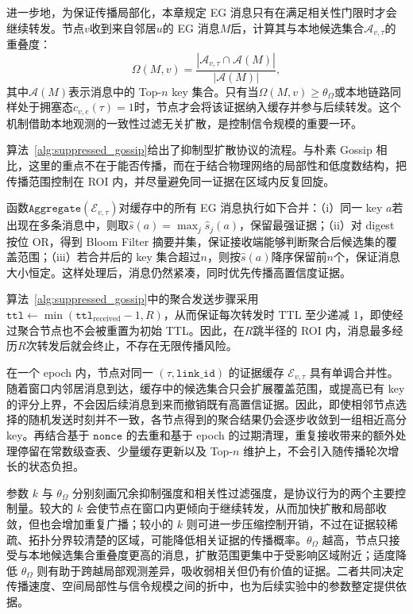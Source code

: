 进一步地，为保证传播局部化，本章规定 EG 消息只有在满足相关性门限时才会继续转发。节点$v$收到来自邻居$u$的 EG 消息$M$后，计算其与本地候选集合$\mathcal{A}_{v,\tau}$的重叠度：
\begin{equation}
\Omega(M,v) = \frac{|\mathcal{A}_{v,\tau}\cap \mathcal{A}(M)|}{|\mathcal{A}(M)|},
\label{eq:overlap}
\end{equation}
其中$\mathcal{A}(M)$表示消息中的 Top-$n$ key 集合。只有当$\Omega(M,v)\ge \theta_\Omega$或本地链路同样处于拥塞态$c_{v,e}(\tau)=1$时，节点才会将该证据纳入缓存并参与后续转发。这个机制借助本地观测的一致性过滤无关扩散，是控制信令规模的重要一环。

算法~\ref{alg:suppressed_gossip}给出了抑制型扩散协议的流程。与朴素 Gossip 相比，这里的重点不在于能否传播，而在于结合物理网络的局部性和低度数结构，把传播范围控制在 ROI 内，并尽量避免同一证据在区域内反复回旋。

函数$\texttt{Aggregate}(\mathcal{E}_{v,\tau})$对缓存中的所有 EG 消息执行如下合并：（i）同一 key $a$若出现在多条消息中，则取$\widehat{s}(a) = \max_j \widehat{s}_j(a)$，保留最强证据；（ii）对 digest 按位 OR，得到 Bloom Filter 摘要并集，保证接收端能够判断聚合后候选集的覆盖范围；（iii）若合并后的 key 集合超过$n$，则按$\widehat{s}(a)$降序保留前$n$个，保证消息大小恒定。这样处理后，消息仍然紧凑，同时优先传播高置信度证据。

算法~\ref{alg:suppressed_gossip}中的聚合发送步骤采用$\texttt{ttl}\leftarrow \min(\texttt{ttl}_{\text{received}}-1, R)$，从而保证每次转发时 TTL 至少递减 1，即使经过聚合节点也不会被重置为初始 TTL。因此，在$R$跳半径的 ROI 内，消息最多经历$R$次转发后就会终止，不存在无限传播风险。

在一个 epoch 内，节点对同一 $(\tau,\texttt{link\_id})$ 的证据缓存 $\mathcal{E}_{v,\tau}$ 具有单调合并性。随着窗口内邻居消息到达，缓存中的候选集合只会扩展覆盖范围，或提高已有 key 的评分上界，不会因后续消息到来而撤销既有高置信证据。因此，即使相邻节点选择的随机发送时刻并不一致，各节点得到的聚合结果仍会逐步收敛到一组相近高分 key。再结合基于 $\texttt{nonce}$ 的去重和基于 epoch 的过期清理，重复接收带来的额外处理停留在常数级查表、少量缓存更新以及 Top-$n$ 维护上，不会引入随传播轮次增长的状态负担。

参数 $k$ 与 $\theta_\Omega$ 分别刻画冗余抑制强度和相关性过滤强度，是协议行为的两个主要控制量。较大的 $k$ 会使节点在窗口内更倾向于继续转发，从而加快扩散和局部收敛，但也会增加重复广播；较小的 $k$ 则可进一步压缩控制开销，不过在证据较稀疏、拓扑分界较清楚的区域，可能降低相关证据的传播概率。$\theta_\Omega$ 越高，节点只接受与本地候选集合重叠度更高的消息，扩散范围更集中于受影响区域附近；适度降低 $\theta_\Omega$ 则有助于跨越局部观测差异，吸收弱相关但仍有价值的证据。二者共同决定传播速度、空间局部性与信令规模之间的折中，也为后续实验中的参数整定提供依据。

